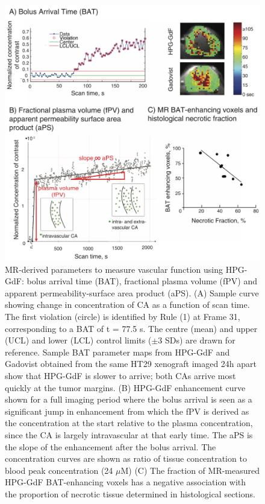 \begin{figure}[htbp]   
 \begin{center}  
 \includegraphics[width=\textwidth]{hpg/hpg-paper1-images/hpg_fig2-bat.png}
 \caption{MR-derived parameters to measure vascular function using HPG-GdF: bolus arrival time (BAT), fractional plasma volume (fPV) and apparent permeability-surface area product (aPS). (A) Sample curve showing change in concentration of CA as a function of scan time. The first violation (circle) is identified by Rule (1) at Frame 31, corresponding to a BAT of t = 77.5 s. The centre (mean) and upper (UCL) and lower (LCL) control limits ($\pm$3 SDs) are drawn for reference. Sample BAT parameter maps from HPG-GdF and Gadovist obtained from the same HT29 xenograft imaged 24h apart show that HPG-GdF is slower to arrive; both CAs arrive most quickly at the tumor margins. (B) HPG-GdF enhancement curve shown for a full imaging period where the bolus arrival is seen as a significant jump in enhancement from which the fPV is derived as the concentration at the start relative to the plasma concentration, since the CA is largely intravascular at that early time. The aPS is the slope of the enhancement after the bolus arrival. The concentration curves are shown as ratio of tissue concentration to blood peak concentration (24 $\mu$M) (C) The fraction of MR-measured HPG-GdF BAT-enhancing voxels has a negative association with the proportion of necrotic tissue determined in histological sections.}  
 \label{hpgpaper1:fig2}  
 \end{center}
\end{figure}

